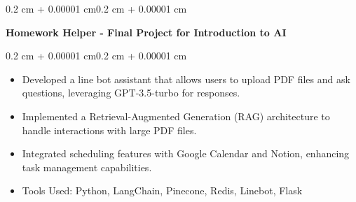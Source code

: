 \documentclass[10pt, letterpaper]{article}
\newenvironment{highlights}{
    \begin{itemize}[
        topsep=0.05 cm,
        parsep=0.05 cm,
        partopsep=0pt,
        itemsep=0pt,
        leftmargin=0.4 cm + 10pt
    ]
}{
    \end{itemize}
}
\newenvironment{onecolentry}{
    \begin{adjustwidth}{0.2 cm + 0.00001 cm}{0.2 cm + 0.00001 cm}
}{
    \end{adjustwidth}
}
\newenvironment{twocolentry}[2][]{
    \onecolentry
    \def\secondColumn{#2}
    \setcolumnwidth{\fill, 4.5 cm}
    \begin{paracol}{2}
}{
    \switchcolumn \raggedleft \secondColumn
    \end{paracol}
    \endonecolentry
}
\let\hrefWithoutArrow\href
\renewcommand{\href}[2]{\hrefWithoutArrow{#1}{\ifthenelse{\equal{#2}{}}{ }{#2 }\raisebox{.15ex}{\footnotesize \faExternalLink*}}}
\begin{document}
        \vspace{0.10 cm}
        \begin{twocolentry}{
        \textit{\href{https://github.com/ChuEating1005/Homework-Helper}{Link}}}
            \textbf{Homework Helper - Final Project for Introduction to AI}
        \end{twocolentry}
        \vspace{0.05 cm}
        \begin{onecolentry}
            \begin{highlights}
                \item Developed a line bot assistant that allows users to upload PDF files and ask questions, leveraging GPT-3.5-turbo for responses.
                \item Implemented a Retrieval-Augmented Generation (RAG) architecture to handle interactions with large PDF files.
                \item Integrated scheduling features with Google Calendar and Notion, enhancing task management capabilities.
                \item Tools Used: Python, LangChain, Pinecone, Redis, Linebot, Flask
            \end{highlights}
        \end{onecolentry}
        
    
\end{document}
